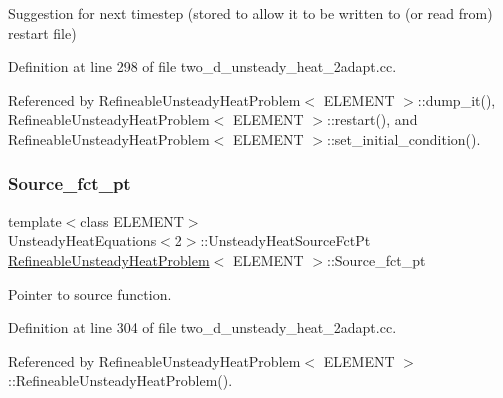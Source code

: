 Suggestion for next timestep (stored to allow it to be written to (or read from) restart file) 

Definition at line 298 of file two\+\_\+d\+\_\+unsteady\+\_\+heat\+\_\+2adapt.\+cc.



Referenced by Refineable\+Unsteady\+Heat\+Problem$<$ E\+L\+E\+M\+E\+N\+T $>$\+::dump\+\_\+it(), Refineable\+Unsteady\+Heat\+Problem$<$ E\+L\+E\+M\+E\+N\+T $>$\+::restart(), and Refineable\+Unsteady\+Heat\+Problem$<$ E\+L\+E\+M\+E\+N\+T $>$\+::set\+\_\+initial\+\_\+condition().

\mbox{\label{classRefineableUnsteadyHeatProblem_a99eb5a2cd4b680b4f83e739bd4e16639}} 
\subsubsection{\texorpdfstring{Source\+\_\+fct\+\_\+pt}{Source\_fct\_pt}}
{\footnotesize\ttfamily template$<$class E\+L\+E\+M\+E\+NT$>$ \\
Unsteady\+Heat\+Equations$<$2$>$\+::Unsteady\+Heat\+Source\+Fct\+Pt \hyperlink{classRefineableUnsteadyHeatProblem}{Refineable\+Unsteady\+Heat\+Problem}$<$ E\+L\+E\+M\+E\+NT $>$\+::Source\+\_\+fct\+\_\+pt\hspace{0.3cm}{\ttfamily [private]}}



Pointer to source function. 



Definition at line 304 of file two\+\_\+d\+\_\+unsteady\+\_\+heat\+\_\+2adapt.\+cc.



Referenced by Refineable\+Unsteady\+Heat\+Problem$<$ E\+L\+E\+M\+E\+N\+T $>$\+::\+Refineable\+Unsteady\+Heat\+Problem().

\mbox{\label{classRefineableUnsteadyHeatProblem_a2febbb317a74e427bf6304235d779fe6}} 
